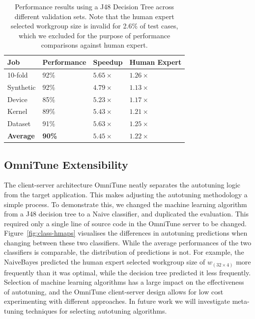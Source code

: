 \documentclass[nonatbib,preprint,9pt]{sigplanconf}
\begin{document}
\begin{table}
\scriptsize
\centering
\begin{tabular}{llll}
\toprule
              Job &    Performance &            Speedup &       Human Expert \\
\midrule
          10-fold &           92\% &       $5.65\times$ &       $1.26\times$ \\
        Synthetic &           92\% &       $4.79\times$ &       $1.13\times$ \\
           Device &           85\% &       $5.23\times$ &       $1.17\times$ \\
           Kernel &           89\% &       $5.43\times$ &       $1.21\times$ \\
          Dataset &           91\% &       $5.63\times$ &       $1.25\times$ \\
 \textbf{Average} &  \textbf{90\%} &  $\bm{5.45\times}$ &  $\bm{1.22\times}$ \\
\bottomrule
\end{tabular}
\caption{%
  Performance results using a J48 Decision Tree across different
  validation sets. Note that the human expert selected workgroup size
  is invalid for 2.6\% of test cases, which we excluded for the
  purpose of performance comparisons against human expert.%
}
\label{tab:class}
\end{table}

\subsection{OmniTune Extensibility}

The client-server architecture OmniTune neatly separates the
autotuning logic from the target application. This makes adjusting the
autotuning methodology a simple process. To demonstrate this, we
changed the machine learning algorithm from a J48 decision tree to a
Naive classifier, and duplicated the evaluation. This required only a
single line of source code in the OmniTune server to be
changed. Figure~\ref{fig:class-hmaps} visualises the differences in
autotuning predictions when changing between these two
classifiers. While the average performances of the two classifiers is
comparable, the distribution of predictions is not. For example, the
NaiveBayes predicted the human expert selected workgroup size of
$w_{(32 \times 4)}$ more frequently than it was optimal, while the
decision tree predicted it less frequently. Selection of machine
learning algorithms has a large impact on the effectiveness of
autotuning, and the OmniTune client-server design allows for low cost
experimenting with different approaches. In future work we will
investigate meta-tuning techniques for selecting autotuning
algorithms.
\end{document}
